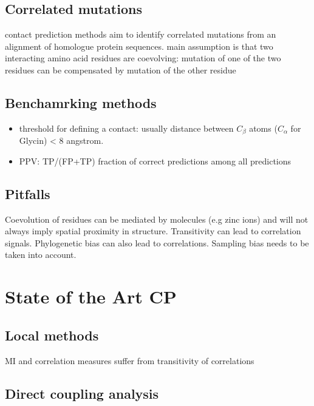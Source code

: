 \documentclass[12pt,a4paper,twoside]{book}
\begin{document}
\subsection{Correlated mutations}\label{correlated-mutations}

contact prediction methods aim to identify correlated mutations from an
alignment of homologue protein sequences. main assumption is that two
interacting amino acid residues are coevolving: mutation of one of the
two residues can be compensated by mutation of the other residue

\subsection{Benchamrking methods}\label{benchamrking-methods}

\begin{itemize}
\item
  threshold for defining a contact: usually distance between \(C_\beta\)
  atoms (\(C_\alpha\) for Glycin) \textless{} 8 angstrom.
\item
  PPV: TP/(FP+TP) fraction of correct predictions among all predictions
\end{itemize}

\subsection{Pitfalls}\label{pitfalls}

Coevolution of residues can be mediated by molecules (e.g zinc ions) and
will not always imply spatial proximity in structure. Transitivity can
lead to correlation signals. Phylogenetic bias can also lead to
correlations. Sampling bias needs to be taken into account.

\section{State of the Art CP}\label{state-of-the-art-cp}

\subsection{Local methods}\label{local-methods}

MI and correlation measures suffer from transitivity of correlations

\subsection{Direct coupling analysis}\label{direct-coupling-analysis}
\end{document}
